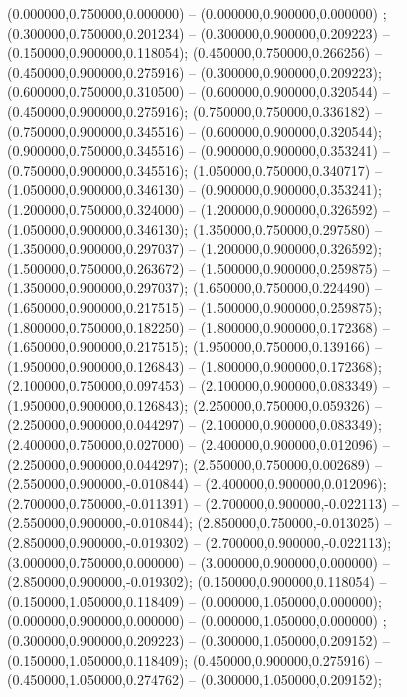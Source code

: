  (0.000000,0.750000,0.000000) -- (0.000000,0.900000,0.000000) ;
 (0.300000,0.750000,0.201234) -- (0.300000,0.900000,0.209223) -- (0.150000,0.900000,0.118054);
 (0.450000,0.750000,0.266256) -- (0.450000,0.900000,0.275916) -- (0.300000,0.900000,0.209223);
 (0.600000,0.750000,0.310500) -- (0.600000,0.900000,0.320544) -- (0.450000,0.900000,0.275916);
 (0.750000,0.750000,0.336182) -- (0.750000,0.900000,0.345516) -- (0.600000,0.900000,0.320544);
 (0.900000,0.750000,0.345516) -- (0.900000,0.900000,0.353241) -- (0.750000,0.900000,0.345516);
 (1.050000,0.750000,0.340717) -- (1.050000,0.900000,0.346130) -- (0.900000,0.900000,0.353241);
 (1.200000,0.750000,0.324000) -- (1.200000,0.900000,0.326592) -- (1.050000,0.900000,0.346130);
 (1.350000,0.750000,0.297580) -- (1.350000,0.900000,0.297037) -- (1.200000,0.900000,0.326592);
 (1.500000,0.750000,0.263672) -- (1.500000,0.900000,0.259875) -- (1.350000,0.900000,0.297037);
 (1.650000,0.750000,0.224490) -- (1.650000,0.900000,0.217515) -- (1.500000,0.900000,0.259875);
 (1.800000,0.750000,0.182250) -- (1.800000,0.900000,0.172368) -- (1.650000,0.900000,0.217515);
 (1.950000,0.750000,0.139166) -- (1.950000,0.900000,0.126843) -- (1.800000,0.900000,0.172368);
 (2.100000,0.750000,0.097453) -- (2.100000,0.900000,0.083349) -- (1.950000,0.900000,0.126843);
 (2.250000,0.750000,0.059326) -- (2.250000,0.900000,0.044297) -- (2.100000,0.900000,0.083349);
 (2.400000,0.750000,0.027000) -- (2.400000,0.900000,0.012096) -- (2.250000,0.900000,0.044297);
 (2.550000,0.750000,0.002689) -- (2.550000,0.900000,-0.010844) -- (2.400000,0.900000,0.012096);
 (2.700000,0.750000,-0.011391) -- (2.700000,0.900000,-0.022113) -- (2.550000,0.900000,-0.010844);
 (2.850000,0.750000,-0.013025) -- (2.850000,0.900000,-0.019302) -- (2.700000,0.900000,-0.022113);
 (3.000000,0.750000,0.000000) -- (3.000000,0.900000,0.000000) -- (2.850000,0.900000,-0.019302);
 (0.150000,0.900000,0.118054) -- (0.150000,1.050000,0.118409) -- (0.000000,1.050000,0.000000);
 (0.000000,0.900000,0.000000) -- (0.000000,1.050000,0.000000) ;
 (0.300000,0.900000,0.209223) -- (0.300000,1.050000,0.209152) -- (0.150000,1.050000,0.118409);
 (0.450000,0.900000,0.275916) -- (0.450000,1.050000,0.274762) -- (0.300000,1.050000,0.209152);
